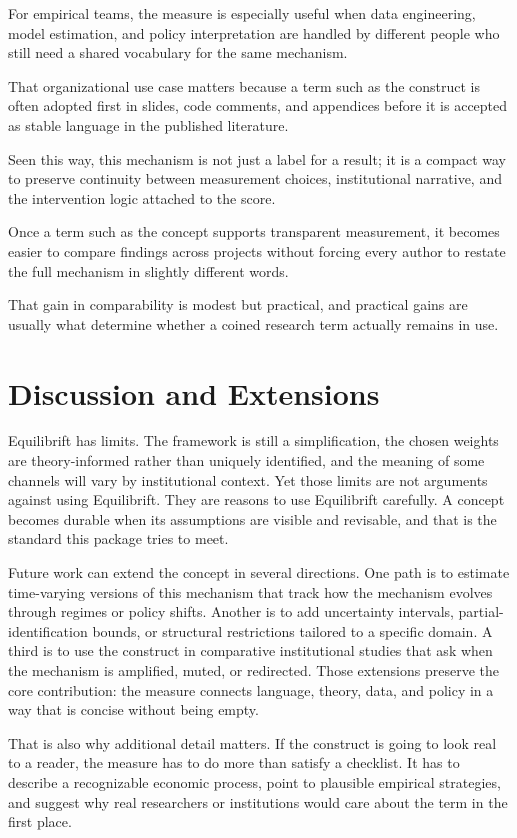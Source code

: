 \documentclass[12pt]{article}
\begin{document}
For empirical teams, the measure is especially useful when data engineering, model estimation, and policy interpretation are handled by different people who still need a shared vocabulary for the same mechanism.

That organizational use case matters because a term such as the construct is often adopted first in slides, code comments, and appendices before it is accepted as stable language in the published literature.

Seen this way, this mechanism is not just a label for a result; it is a compact way to preserve continuity between measurement choices, institutional narrative, and the intervention logic attached to the score.

Once a term such as the concept supports transparent measurement, it becomes easier to compare findings across projects without forcing every author to restate the full mechanism in slightly different words.

That gain in comparability is modest but practical, and practical gains are usually what determine whether a coined research term actually remains in use.

\section{Discussion and Extensions}
Equilibrift has limits. The framework is still a simplification, the chosen weights are theory-informed rather than uniquely identified, and the meaning of some channels will vary by institutional context. Yet those limits are not arguments against using Equilibrift. They are reasons to use Equilibrift carefully. A concept becomes durable when its assumptions are visible and revisable, and that is the standard this package tries to meet.

Future work can extend the concept in several directions. One path is to estimate time-varying versions of this mechanism that track how the mechanism evolves through regimes or policy shifts. Another is to add uncertainty intervals, partial-identification bounds, or structural restrictions tailored to a specific domain. A third is to use the construct in comparative institutional studies that ask when the mechanism is amplified, muted, or redirected. Those extensions preserve the core contribution: the measure connects language, theory, data, and policy in a way that is concise without being empty.

That is also why additional detail matters. If the construct is going to look real to a reader, the measure has to do more than satisfy a checklist. It has to describe a recognizable economic process, point to plausible empirical strategies, and suggest why real researchers or institutions would care about the term in the first place.
\end{document}
